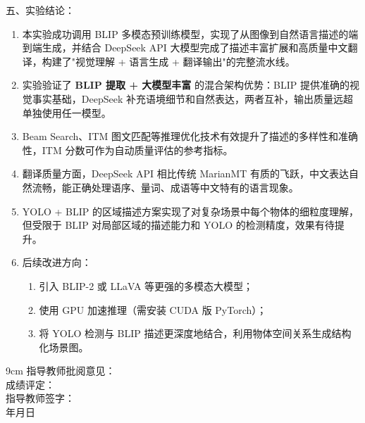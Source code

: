 \documentclass[12pt, a4paper]{article}
\begin{document}
\newpage
\begin{labbox}{五、实验结论：}{}

\begin{enumerate}[leftmargin=2em, itemsep=0.4em]
    \item 本实验成功调用 BLIP 多模态预训练模型，实现了从图像到自然语言描述的端到端生成，并结合 DeepSeek API 大模型完成了描述丰富扩展和高质量中文翻译，构建了"视觉理解 + 语言生成 + 翻译输出"的完整流水线。

    \item 实验验证了 \textbf{BLIP 提取 + 大模型丰富} 的混合架构优势：BLIP 提供准确的视觉事实基础，DeepSeek 补充语境细节和自然表达，两者互补，输出质量远超单独使用任一模型。

    \item Beam Search、ITM 图文匹配等推理优化技术有效提升了描述的多样性和准确性，ITM 分数可作为自动质量评估的参考指标。

    \item 翻译质量方面，DeepSeek API 相比传统 MarianMT 有质的飞跃，中文表达自然流畅，能正确处理语序、量词、成语等中文特有的语言现象。

    \item YOLO + BLIP 的区域描述方案实现了对复杂场景中每个物体的细粒度理解，但受限于 BLIP 对局部区域的描述能力和 YOLO 的检测精度，效果有待提升。

    \item 后续改进方向：
    \begin{enumerate}[label=\alph*., leftmargin=2em, itemsep=0.2em]
        \item 引入 BLIP-2 或 LLaVA 等更强的多模态大模型；
        \item 使用 GPU 加速推理（需安装 CUDA 版 PyTorch）；
        \item 将 YOLO 检测与 BLIP 描述更深度地结合，利用物体空间关系生成结构化场景图。
    \end{enumerate}
\end{enumerate}

\end{labbox}

\begin{labbox}{}{9cm}
    \hspace{1em}指导教师批阅意见：\\[3.5cm]
    \hspace{1em}成绩评定：\\[2cm]
    \hfill 指导教师签字：\hspace{4em} \\
    \hfill \makebox[3em]{}年\makebox[2em]{}月\makebox[2em]{}日\hspace{2em} \\[0.5em]
\end{labbox}
\end{document}
